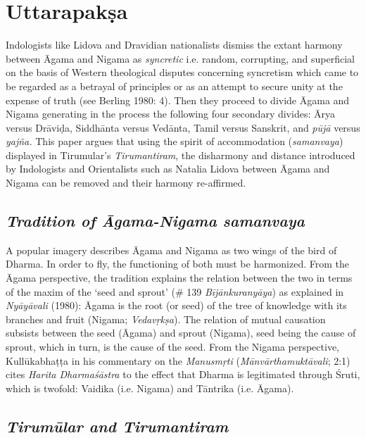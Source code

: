 \section*{Uttarapakṣa}

Indologists like Lidova and Dravidian nationalists dismiss the extant harmony between Āgama and Nigama as \textit{syncretic} i.e. random, corrupting, and superficial on the basis of Western theological disputes concerning syncretism which came to be regarded as a betrayal of principles or as an attempt to secure unity at the expense of truth (see Berling 1980: 4). Then they proceed to divide Āgama and Nigama generating in the process the following four secondary divides: Ārya versus Drāviḍa, Siddhānta versus Vedānta, Tamil versus Sanskrit, and \textit{pūjā} versus \textit{yajña.} This paper argues that using the spirit of accommodation (\textit{samanvaya}) displayed in Tirumular’s \textit{Tirumantiram}, the disharmony and distance introduced by Indologists and Orientalists such as Natalia Lidova between Āgama and Nigama can be removed and their harmony re-affirmed.

\subsection*{\textit{Tradition of Āgama-Nigama samanvaya}}

A popular imagery describes Āgama and Nigama as two wings of the bird of Dharma. In order to fly, the functioning of both must be harmonized. From the Āgama perspective, the tradition explains the relation between the two in terms of the maxim of the ‘seed and sprout’ (\# 139 \textit{Bījānkuranyāya}) as explained in \textit{Nyāyāvali} (1980): Āgama is the root (or seed) of the tree of knowledge with its branches and fruit (Nigama; \textit{Vedavṛkṣa}). The relation of mutual causation subsists between the seed (Āgama) and sprout (Nigama), seed being the cause of sprout, which in turn, is the cause of the seed. From the Nigama perspective, Kullūkabhaṭṭa in his commentary on the \textit{Manusmṛti} (\textit{Mānvārthamuktāvali}; 2:1) cites \textit{Harita Dharmaśāstra} to the effect that Dharma is legitimated through Śruti, which is twofold: Vaidika (i.e. Nigama) and Tāntrika (i.e. Āgama).

\newpage


\subsection*{\textit{Tirumūlar and Tirumantiram}}


